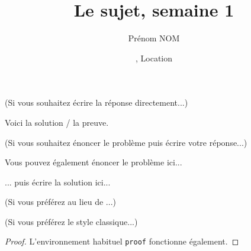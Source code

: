 \documentclass[11pt,
  logo = {example-image},
  title in boldface,
  theorem in new line,
]{homework}
\title{Le sujet, semaine 1}
\author{Prénom NOM}
\date{\TheDate{2023-12-25}, Location}
\begin{document}
\bigskip\textcolor{gray!55}{(Si vous souhaitez écrire la réponse directement...)}

\begin{problem}
    Voici la solution / la preuve.
\end{problem}


\bigskip\textcolor{gray!55}{(Si vous souhaitez énoncer le problème puis écrire votre réponse...)}

\begin{problem}
    Vous pouvez également énoncer le problème ici...
\end{problem}

\begin{solution}
    ... puis écrire la solution ici...
\end{solution}

\bigskip\textcolor{gray!55}{(Si vous préférez  au lieu de ...)}



\bigskip\textcolor{gray!55}{(Si vous préférez le style classique...)}

\begin{proof}
    L'environnement habituel \verb|proof| fonctionne également.
\end{proof}
\end{document}
